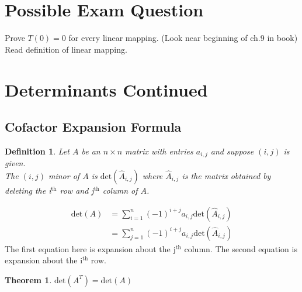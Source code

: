 \documentclass{report}
\newtheorem*{defn}{Definition}
\newtheorem*{thrm}{Theorem}
\begin{document}
\section{Possible Exam Question}
Prove $T(0)=0$ for every linear mapping. (Look near beginning of ch.9 in book) Read definition of linear mapping.

\section{Determinants Continued}
\subsection{Cofactor Expansion Formula}
\begin{defn}
Let $A$ be an $n\times n$ matrix with entries $a_{i,j}$ and suppose $(i,j)$ is given.\\
The $(i,j)$ minor of $A$ is $\mathrm{det}(\hat{A}_{i,j})$ where $\hat{A}_{i,j}$ is the matrix obtained by deleting the i$^{\mathrm{th}}$ row and j$^{\mathrm{th}}$ column of $A$.
\end{defn}

\begin{align*}
\mathrm{det}(A)&=\sum_{i=1}^n(-1)^{i+j}a_{i,j}\mathrm{det}(\hat{A}_{i,j})\\
&= \sum_{j=1}^n(-1)^{i+j}a_{i,j}\mathrm{det}(\hat{A}_{i,j})
\end{align*}
The first equation here is expansion about the j$^{\mathrm{th}}$ column. The second equation is expansion about the i$^{\mathrm{th}}$ row.
\begin{thrm}
$\mathrm{det}(A^T)=\mathrm{det}(A)$
\end{thrm}
\end{document}
